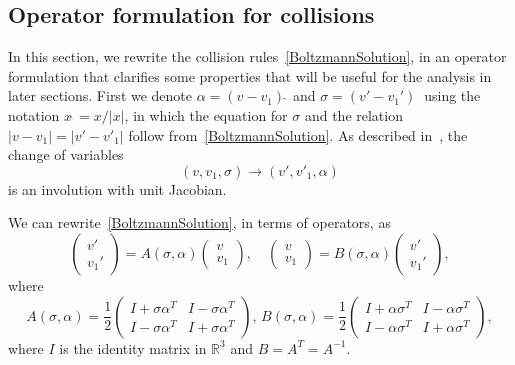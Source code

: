 \documentclass[times,final,nopreprintline]{elsarticle}
\newcommand{\bbR}{\mathbb R} \newcommand{\bbS}{\mathbb S}
\newcommand{\Rthree}{{\bbR^3}}
\begin{document}


\subsection{Operator formulation for collisions}\label{sec:operator_notation}

In this section, we rewrite the collision rules~\eqref{BoltzmannSolution}, in an operator formulation that clarifies some properties that will be useful for the analysis in later sections. First we denote $\alpha = (v -v_1){\hat~}$ and  $\sigma = (v' -v_1'){\hat~}$ using the notation $x{\hat~} = x/|x|$, in which the equation for $\sigma$ and the relation $|v-v_1| = |v'-v'_1|$ follow from~\eqref{BoltzmannSolution}. As described in~\cite[P.53]{villani2002review}, the change of variables   
\begin{equation}
    (v,v_1,\sigma) \longrightarrow     (v',v'_1,\alpha) 
\end{equation}
is an involution  with unit Jacobian. 



We can rewrite~\eqref{BoltzmannSolution}, in terms of operators, as
\begin{equation}\label{eq:AB_vel_General}
        \begin{pmatrix}
    v'\\
   v_1'
    \end{pmatrix}    = A(\sigma,\alpha) \begin{pmatrix}
    v\\
    v_1
    \end{pmatrix}, \quad 
   \begin{pmatrix}
    v\\
     v_1
    \end{pmatrix}     = B(\sigma,\alpha)    \begin{pmatrix}
    v'\\
    v_1'
    \end{pmatrix},
\end{equation}
where
\begin{equation} \label{eq:AB_def}
A(\sigma ,\alpha )= \dfrac{1}{2}\begin{pmatrix}
    I+\sigma  \alpha ^T & I-\sigma  \alpha ^T\\
    I-\sigma  \alpha ^T & I+\sigma  \alpha ^T
    \end{pmatrix},\,B(\sigma ,\alpha )= \dfrac{1}{2}\begin{pmatrix}
    I+\alpha  \sigma ^T & I-\alpha  \sigma ^T\\
    I-\alpha  \sigma ^T & I+\alpha  \sigma ^T
    \end{pmatrix},
\end{equation}
where $I$ is the identity matrix in $\Rthree$ and $B= A^T = A^{-1}$. 
\end{document}
